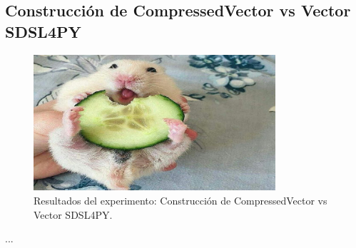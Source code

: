 \subsection{Construcción de CompressedVector vs Vector SDSL4PY}
\label{exp:build-cv-sdsl}

\begin{figure}[H]
    \centering
    \includegraphics[width=0.8\textwidth]{testing/images/cvd_sdsl_build.png}
    \caption{Resultados del experimento: Construcción de CompressedVector vs Vector SDSL4PY.}
    \label{fig:build-cv-sdsl}
\end{figure}

...
